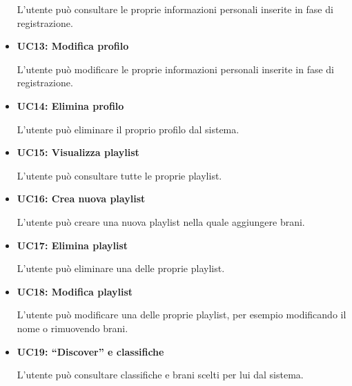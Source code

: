 \begin{itemize}
      L'utente può consultare le proprie informazioni personali inserite in fase di registrazione.
      \item \textbf{UC13: Modifica profilo} 
      
      L'utente può modificare le proprie informazioni personali inserite in fase di registrazione.
      \item \textbf{UC14: Elimina profilo} 
      
      L'utente può eliminare il proprio profilo dal sistema.
      \item \textbf{UC15: Visualizza playlist} 
      
      L'utente può consultare tutte le proprie playlist.
      \item \textbf{UC16: Crea nuova playlist} 
      
      L'utente può creare una nuova playlist nella quale aggiungere brani.
      \item \textbf{UC17: Elimina playlist}
      
      L'utente può eliminare una delle proprie playlist.
      \item \textbf{UC18: Modifica playlist} 
      
      L'utente può modificare una delle proprie playlist, per esempio modificando il nome o rimuovendo brani.
      \item \textbf{UC19: ``Discover'' e classifiche} 
      
      L'utente può consultare classifiche e brani scelti per lui dal sistema.

\end{itemize}

